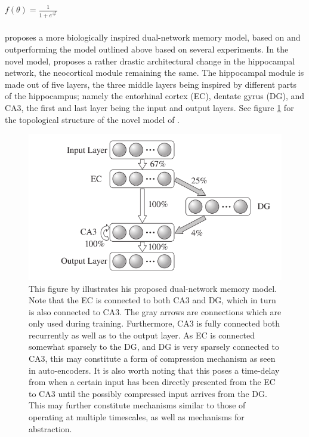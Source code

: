 \begin{center}
\begin{math}
    f(\theta) = \frac{1}{1 + e^{\frac{-\theta}{\epsilon}}}
\end{math}
\end{center}

\subsubsection{\cite{Hattori2014}}
\cite{Hattori2014} proposes a more biologically inspired dual-network memory model, based on and outperforming the model outlined above based on several experiments. In the novel model, \cite{Hattori2014} proposes a rather drastic architectural change in the hippocampal network, the neocortical module remaining the same. The hippocampal module is made out of five layers, the three middle layers being inspired by different parts of the hippocampus; namely the entorhinal cortex (EC), dentate gyrus (DG), and CA3, the first and last layer being the input and output layers. See figure \ref{fig:hattori_2014_model} for the topological structure of the novel model of \cite{Hattori2014}.

\begin{figure}
\centering
\includegraphics[width=12cm]{fig/hattori2014_hpc_module}
\caption{This figure by \cite{Hattori2014} illustrates his proposed dual-network memory model. Note that the EC is connected to both CA3 and DG, which in turn is also connected to CA3. The gray arrows are connections which are only used during training. Furthermore, CA3 is fully connected both recurrently as well as to the output layer. As EC is connected somewhat sparsely to the DG, and DG is very sparsely connected to CA3, this may constitute a form of compression mechanism as seen in auto-encoders. It is also worth noting that this poses a time-delay from when a certain input has been directly presented from the EC to CA3 until the possibly compressed input arrives from the DG. This may further constitute mechanisms similar to those of operating at multiple timescales, as well as mechanisms for abstraction.}
\label{fig:hattori_2014_model}
\end{figure}

